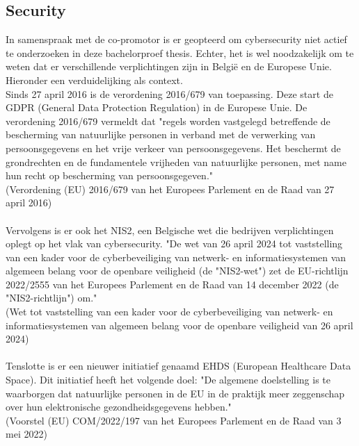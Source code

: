 \subsection{Security}
In samenspraak met de co-promotor is er geopteerd om cybersecurity niet actief te onderzoeken in deze bachelorproef thesis. Echter, het is wel noodzakelijk om te weten dat er verschillende verplichtingen zijn in België en de Europese Unie. Hieronder een verduidelijking als context.
\\
Sinds 27 april 2016 is de verordening 2016/679 van toepassing. Deze start de GDPR (General Data Protection Regulation) in de Europese Unie. De verordening 2016/679 vermeldt dat "regels worden vastgelegd betreffende de bescherming van natuurlijke personen in verband met de verwerking van persoonsgegevens en het vrije verkeer van persoonsgegevens. Het beschermt de grondrechten en de fundamentele vrijheden van natuurlijke personen, met name hun recht op bescherming van persoonsgegeven."\\ (Verordening (EU) 2016/679 van het Europees Parlement en de Raad van 27 april 2016) %
\\\\
Vervolgens is er ook het NIS2, een Belgische wet die bedrijven verplichtingen oplegt op het vlak van cybersecurity. "De wet van 26 april 2024 tot vaststelling van een kader voor de cyberbeveiliging van netwerk- en informatiesystemen van algemeen belang voor de openbare veiligheid (de "NIS2-wet") zet de EU-richtlijn 2022/2555 van het Europees Parlement en de Raad van 14 december 2022 (de "NIS2-richtlijn") om." \\
(Wet tot vaststelling van een kader voor de cyberbeveiliging van netwerk- en informatiesystemen van algemeen belang voor de openbare veiligheid van 26 april 2024) %
\\\\
Tenslotte is er een nieuwer initiatief genaamd EHDS (European Healthcare Data Space). Dit initiatief heeft het volgende doel: "De algemene doelstelling is te waarborgen dat natuurlijke personen in de EU in de praktijk meer zeggenschap over hun elektronische gezondheidsgegevens hebben."\\ (Voorstel (EU) COM/2022/197 van het Europees Parlement en de Raad van 3 mei 2022) %



